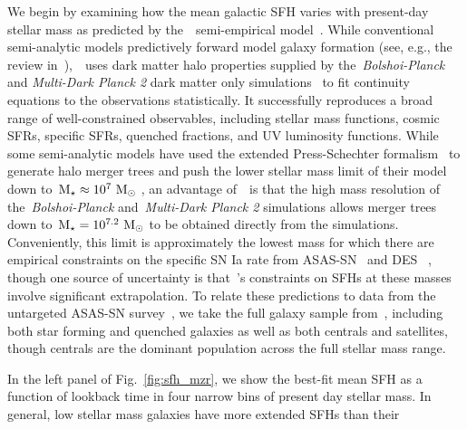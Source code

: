 \documentclass[foo.tex]{subfiles}
\begin{document}
We begin by examining how the mean galactic SFH varies with present-day stellar
mass as predicted by the~\um~semi-empirical model~\citep{Behroozi2019}.
{\color{red}
While conventional semi-analytic models predictively forward model galaxy
formation (see, e.g., the review in~\citealt{Somerville2015a}),~\um~uses dark
matter halo properties supplied by the~\textit{Bolshoi-Planck} and
\textit{Multi-Dark Planck 2} dark matter only simulations~\citep{Klypin2016}
to fit continuity equations to the observations statistically.
It successfully reproduces a broad range of well-constrained observables,
including stellar mass functions, cosmic SFRs, specific SFRs, quenched
fractions, and UV luminosity functions.
}
While some semi-analytic models have used the extended Press-Schechter
formalism~\citep{Press1974, Bond1991} to generate halo merger trees and push
the lower stellar mass limit of their model down to~$\text{M}_\star \approx 10^7~\text{M}_\odot$
\citep[e.g.][]{Somerville2015b}, an advantage of~\um~is that the high mass
resolution of the~\textit{Bolshoi-Planck} and~\textit{Multi-Dark Planck 2}
simulations allows merger trees down to~$\text{M}_\star = 10^{7.2}~\text{M}_\odot$ to be
obtained directly from the simulations.
Conveniently, this limit is approximately the lowest mass for which there are
empirical constraints on the specific SN Ia rate from ASAS-SN~\citep{Brown2019}
and DES~\citep{Wiseman2021}%
{\color{red}%
, though one source of uncertainty is that~\um's constraints on SFHs at these
masses involve significant extrapolation.}
To relate these predictions to data from the untargeted ASAS-SN
survey~\citep{Shappee2014, Kochanek2017}, we take the full galaxy
sample from~\um, including both star forming and quenched galaxies as
well as both centrals and satellites, though centrals are the dominant
population across the full stellar mass range.
\par
In the left panel of Fig.~\ref{fig:sfh_mzr}, we show the best-fit mean SFH as a
function of lookback time in four narrow bins of present day stellar mass.
In general, low stellar mass galaxies have more extended SFHs than their
\end{document}
